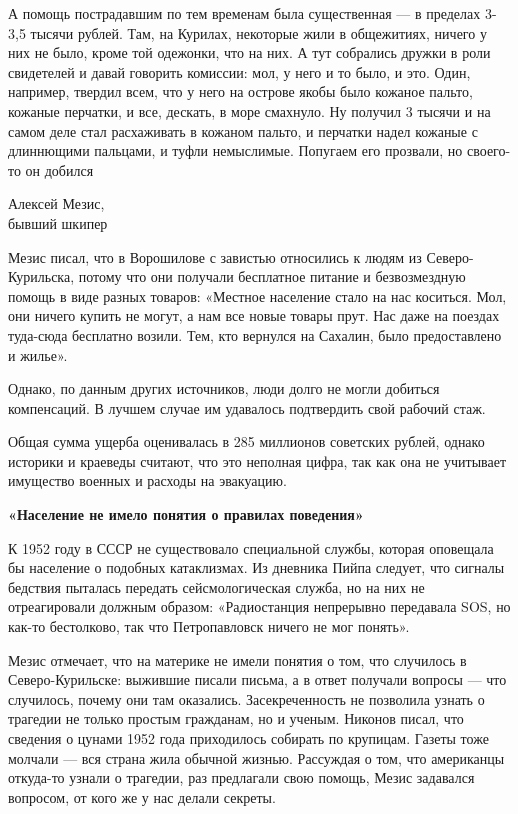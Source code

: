 \begin{fancyquotes}
    А помощь пострадавшим по тем временам была существенная --- в пределах 3-3,5 тысячи рублей. Там, на Курилах, некоторые жили в общежитиях, ничего у них не было, кроме той одежонки, что на них. А тут собрались дружки в роли свидетелей и давай говорить комиссии: мол, у него и то было, и это. Один, например, твердил всем, что у него на острове якобы было кожаное пальто, кожаные перчатки, и все, дескать, в море смахнуло. Ну получил 3 тысячи и на самом деле стал расхаживать в кожаном пальто, и перчатки надел кожаные с длиннющими пальцами, и туфли немыслимые. Попугаем его прозвали, но своего-то он добился\\

    \begin{flushright}
        Алексей Мезис,
        \\
        бывший шкипер
    \end{flushright}
\end{fancyquotes}

Мезис писал, что в Ворошилове с завистью относились к людям из Северо-Курильска, потому что они получали бесплатное питание и безвозмездную помощь в виде разных товаров: «Местное население стало на нас коситься. Мол, они ничего купить не могут, а нам все новые товары прут. Нас даже на поездах туда-сюда бесплатно возили. Тем, кто вернулся на Сахалин, было предоставлено и жилье».

Однако, по данным других источников, люди долго не могли добиться компенсаций. В лучшем случае им удавалось подтвердить свой рабочий стаж.

Общая сумма ущерба оценивалась в 285 миллионов советских рублей, однако историки и краеведы считают, что это неполная цифра, так как она не учитывает имущество военных и расходы на эвакуацию.

\textbf{«Население не имело понятия о правилах поведения»}

К 1952 году в СССР не существовало специальной службы, которая оповещала бы население о подобных катаклизмах. Из дневника Пийпа следует, что сигналы бедствия пыталась передать сейсмологическая служба, но на них не отреагировали должным образом: «Радиостанция непрерывно передавала SOS, но как-то бестолково, так что Петропавловск ничего не мог понять».

Мезис отмечает, что на материке не имели понятия о том, что случилось в Северо-Курильске: выжившие писали письма, а в ответ получали вопросы --- что случилось, почему они там оказались. Засекреченность не позволила узнать о трагедии не только простым гражданам, но и ученым. Никонов писал, что сведения о цунами 1952 года приходилось собирать по крупицам. Газеты тоже молчали --- вся страна жила обычной жизнью. Рассуждая о том, что американцы откуда-то узнали о трагедии, раз предлагали свою помощь, Мезис задавался вопросом, от кого же у нас делали секреты.

